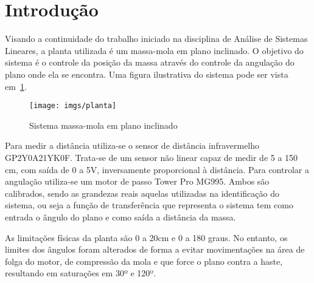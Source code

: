 
\section{Introdução}%
\label{introducao}

Visando a continuidade do trabalho iniciado na disciplina de Análise de Sistemas
Lineares, a planta utilizada é um massa-mola em plano inclinado. O objetivo do
sistema é o controle da posição da massa através do controle da angulação do
plano onde ela se encontra. Uma figura ilustrativa do sistema pode ser vista
em~\ref{fig:plant}.

\begin{figure}[H]
	\centering
	\captionsetup{justification=centering}
	\texttt{[image: imgs/planta]}
	\caption{Sistema massa-mola em plano inclinado}%
	\label{fig:plant}
\end{figure}

Para medir a distância utiliza-se o sensor de distância infravermelho
GP2Y0A21YK0F. Trata-se de um sensor não linear capaz de medir de 5 a 150 cm, com
saída de 0 a 5V, inversamente proporcional à distância. Para controlar a
angulação utiliza-se um motor de passo Tower Pro MG995. Ambos são calibrados,
sendo as grandezas reais aquelas utilizadas na identificação do sistema, ou seja
a função de transferência que representa o sistema tem como entrada o ângulo do
plano e como saída a distância da massa.

As limitações físicas da planta são 0 a 20cm e 0 a 180 graus. No entanto, os
limites dos ângulos foram alterados de forma a evitar movimentações na área de
folga do motor, de compressão da mola e que force o plano contra a haste,
resultando em saturações em 30º e 120º.
